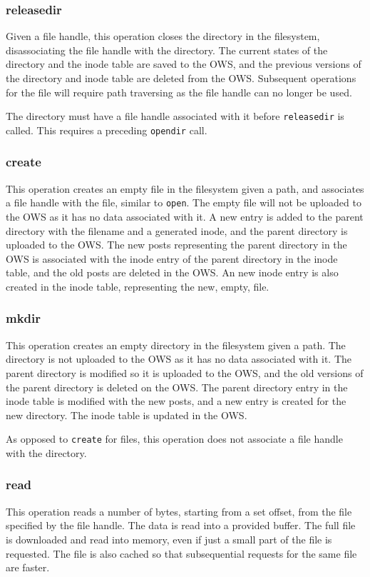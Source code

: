 \subsubsection{releasedir}
Given a file handle, this operation closes the directory in the filesystem, disassociating the file handle with the directory. The current states of the directory and the inode table are saved to the OWS, and the previous versions of the directory and inode table are deleted from the OWS. Subsequent operations for the file will require path traversing as the file handle can no longer be used.

The directory must have a file handle associated with it before \texttt{releasedir} is called. This requires a preceding \texttt{opendir} call.

\subsubsection{create}
This operation creates an empty file in the filesystem given a path, and associates a file handle with the file, similar to \texttt{open}. The empty file will not be uploaded to the OWS as it has no data associated with it. A new entry is added to the parent directory with the filename and a generated inode, and the parent directory is uploaded to the OWS. The new posts representing the parent directory in the OWS is associated with the inode entry of the parent directory in the inode table, and the old posts are deleted in the OWS. An new inode entry is also created in the inode table, representing the new, empty, file.

\subsubsection{mkdir}
This operation creates an empty directory in the filesystem given a path. The directory is not uploaded to the OWS as it has no data associated with it. The parent directory is modified so it is uploaded to the OWS, and the old versions of the parent directory is deleted on the OWS. The parent directory entry in the inode table is modified with the new posts, and a new entry is created for the new directory. The inode table is updated in the OWS.

As opposed to \texttt{create} for files, this operation does not associate a file handle with the directory.

\subsubsection{read}
This operation reads a number of bytes, starting from a set offset, from the file specified by the file handle. The data is read into a provided buffer. The full file is downloaded and read into memory, even if just a small part of the file is requested. The file is also cached so that subsequential requests for the same file are faster. 

